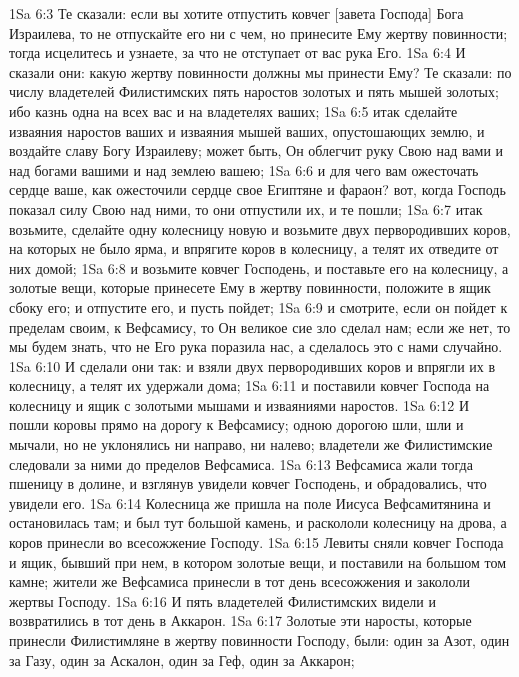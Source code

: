 \vs 1Sa 6:3 Те сказали: если вы хотите отпустить ковчег [завета Господа] Бога Израилева, то не отпускайте его ни с чем, но принесите Ему жертву повинности; тогда исцелитесь и узнаете, за что не отступает от вас рука Его.
\vs 1Sa 6:4 И сказали они: какую жертву повинности должны мы принести Ему? Те сказали: по числу владетелей Филистимских пять наростов золотых и пять мышей золотых; ибо казнь одна на всех вас и на владетелях ваших;
\vs 1Sa 6:5 итак сделайте изваяния наростов ваших и изваяния мышей ваших, опустошающих землю, и воздайте славу Богу Израилеву; может быть, Он облегчит руку Свою над вами и над богами вашими и над землею вашею;
\vs 1Sa 6:6 и для чего вам ожесточать сердце ваше, как ожесточили сердце свое Египтяне и фараон? вот, когда Господь показал силу Свою над ними, то они отпустили их, и те пошли;
\vs 1Sa 6:7 итак возьмите, сделайте одну колесницу новую и возьмите двух первородивших коров, на которых не было ярма, и впрягите коров в колесницу, а телят их отведите от них домой;
\vs 1Sa 6:8 и возьмите ковчег Господень, и поставьте его на колесницу, а золотые вещи, которые принесете Ему в жертву повинности, положите в ящик сбоку его; и отпустите его, и пусть пойдет;
\vs 1Sa 6:9 и смотрите, если он пойдет к пределам своим, к Вефсамису, то Он великое сие зло сделал нам; если же нет, то мы будем знать, что не Его рука поразила нас, а сделалось это с нами случайно.
\vs 1Sa 6:10 И сделали они так: и взяли двух первородивших коров и впрягли их в колесницу, а телят их удержали дома;
\vs 1Sa 6:11 и поставили ковчег Господа на колесницу и ящик с золотыми мышами и изваяниями наростов.
\vs 1Sa 6:12 И пошли коровы прямо на дорогу к Вефсамису; одною дорогою шли, шли и мычали, но не уклонялись ни направо, ни налево; владетели же Филистимские следовали за ними до пределов Вефсамиса.
\vs 1Sa 6:13  Вефсамиса жали тогда пшеницу в долине, и взглянув увидели ковчег Господень, и обрадовались, что увидели его.
\vs 1Sa 6:14 Колесница же пришла на поле Иисуса Вефсамитянина и остановилась там; и был тут большой камень, и раскололи колесницу на дрова, а коров принесли во всесожжение Господу.
\vs 1Sa 6:15 Левиты сняли ковчег Господа и ящик, бывший при нем, в котором  золотые вещи, и поставили на большом том камне; жители же Вефсамиса принесли в тот день всесожжения и закололи жертвы Господу.
\vs 1Sa 6:16 И пять владетелей Филистимских видели  и возвратились в тот день в Аккарон.
\vs 1Sa 6:17 Золотые эти наросты, которые принесли Филистимляне в жертву повинности Господу, были: один за Азот, один за Газу, один за Аскалон, один за Геф, один за Аккарон;
